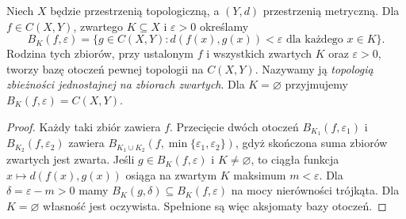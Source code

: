 \begin{definicja}
\label{def:topog-odwzorowania-jednostajna-zwarte}
Niech $X$ będzie przestrzenią topologiczną,
a $(Y,d)$ przestrzenią metryczną.
Dla $f\in C(X,Y)$, zwartego
$K\subseteq X$ i $\varepsilon>0$ określamy
\[
B_K(f,\varepsilon)=
\{g\in C(X,Y):
 d(f(x),g(x))<\varepsilon
 \text{ dla każdego }x\in K\}.
\]
Rodzina tych zbiorów, przy ustalonym $f$
i wszystkich zwartych $K$ oraz
$\varepsilon>0$, tworzy bazę
otoczeń pewnej topologii na $C(X,Y)$.
Nazywamy ją \emph{topologią zbieżności
jednostajnej na zbiorach zwartych}.
Dla $K=\varnothing$ przyjmujemy
$B_K(f,\varepsilon)=C(X,Y)$.
\end{definicja}
\begin{proof}
Każdy taki zbiór zawiera $f$.
Przecięcie dwóch otoczeń
$B_{K_1}(f,\varepsilon_1)$ i
$B_{K_2}(f,\varepsilon_2)$ zawiera
$B_{K_1\cup K_2}(f,\min\{\varepsilon_1,
\varepsilon_2\})$, gdyż skończona suma
zbiorów zwartych jest zwarta.
Jeśli $g\in B_K(f,\varepsilon)$
i $K\ne\varnothing$, to ciągła
funkcja $x\mapsto d(f(x),g(x))$
osiąga na zwartym $K$ maksimum
$m<\varepsilon$. Dla
$\delta=\varepsilon-m>0$
mamy
$B_K(g,\delta)\subseteq
B_K(f,\varepsilon)$
na mocy nierówności trójkąta.
Dla $K=\varnothing$ własność
jest oczywista. Spełnione są
więc aksjomaty bazy otoczeń.
\end{proof}

